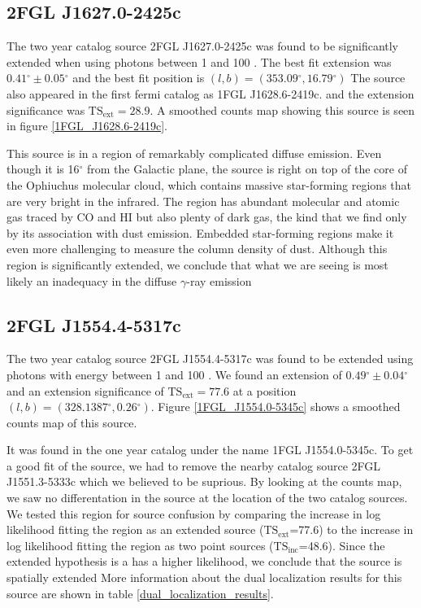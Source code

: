 \documentclass[12pt,preprint]{aastex}
\newcommand{\gev}{\text{GeV}\xspace}
\newcommand{\tsext}{{\ensuremath{\text{TS}_\text{ext}}}\xspace}
\newcommand{\tsinc}{\ensuremath{\text{TS}_\text{inc}}\xspace}
\renewcommand{\deg}{\ensuremath{^\circ}\xspace}
\begin{document}
\subsection{2FGL J1627.0-2425c}


The two year catalog source 2FGL J1627.0-2425c was found to be significantly
extended when using photons between 1 \gev and 100 \gev.  The best
fit extension was $0.41\deg\pm0.05\deg$ and the best fit position is
$(l,b)=(353.09\deg, 16.79\deg)$ The source also appeared in the first
fermi catalog as 1FGL J1628.6-2419c.  and the extension significance
was $\tsext=28.9$.  A smoothed counts map showing this source is seen
in figure \ref{1FGL_J1628.6-2419c}.

This source is in a region of remarkably complicated diffuse emission.
Even though it is 16\deg from the Galactic plane,
the source is right on top of the core of the Ophiuchus molecular cloud,
which contains massive star-forming regions that are very bright
in the infrared.  The region has abundant molecular and atomic gas
traced by CO and HI but also plenty of dark gas, the kind that
we find only by its association with dust emission.
Embedded star-forming regions make it even more challenging to measure
the column density of dust.
Although this region is significantly extended, we conclude that what we
are seeing is most likely an inadequacy in the diffuse $\gamma$-ray emission


\subsection{2FGL J1554.4-5317c}


The two year catalog source 2FGL J1554.4-5317c was found to be
extended using photons with energy between 1 \gev and 100 \gev.
We found an extension of $0.49\deg\pm 0.04\deg$ and an extension significance of
$\tsext=77.6$ at a position $(l,b)=(328.1387\deg,0.26\deg)$.  Figure
\ref{1FGL_J1554.0-5345c} shows a smoothed counts map of this source.

It was found in the one year catalog under the name 1FGL J1554.0-5345c.
To get a good fit of the source, we had to remove the nearby catalog
source 2FGL J1551.3-5333c
which we believed to be suprious. By looking at
the counts map, we saw no differentation in the source at the location
of the two catalog sources. We tested this region for source confusion
by comparing the increase in log likelihood fitting the region as an
extended source (\tsext=77.6) to the increase in log likelihood fitting
the region as two point sources (\tsinc=48.6).  Since the extended
hypothesis is a has a higher likelihood, we conclude that the source is
spatially extended More
information about the dual localization results for this source are
shown in table \ref{dual_localization_results}.
\end{document}
